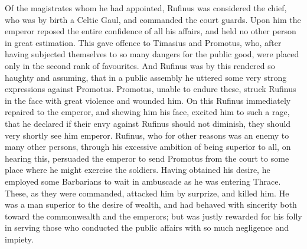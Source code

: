 Of the magistrates whom he had appointed, Rufinus was considered the chief,
who was by birth a Celtic Gaul, and commanded the court guards. Upon him
the emperor reposed the entire confidence of all his affairs, and held no other
person in great estimation. This gave offence to Timasius and Promotus,
who, after having subjected themselves to so many dangers for the public good,
were placed only in the second rank of favourites. And Rufinus was by this
rendered so haughty and assuming, that in a public assembly he uttered some very
strong expressions against Promotus. Promotus, unable to endure these,
struck Rufinus in the face with great violence and wounded him. On this
Rufinus immediately repaired to the emperor, and shewing him his face, excited
him to such a rage, that he declared if their envy against Rufinus should not
diminish, they should very shortly see him emperor. Rufinus, who for other
reasons was an enemy to many other persons, through his excessive ambition of
being superior to all, on hearing this, persuaded the emperor to send Promotus
from the court to some place where he might exercise the soldiers. Having
obtained his desire, he employed some Barbarians to wait in ambuscade as he was
entering Thrace. These, as they were commanded, attacked him by surprize,
and killed him. He was a man superior to the desire of wealth, and had
behaved with sincerity both toward the commonwealth and the emperors; but was
justly rewarded for his folly in serving those who conducted the public affairs
with so much negligence and impiety.

